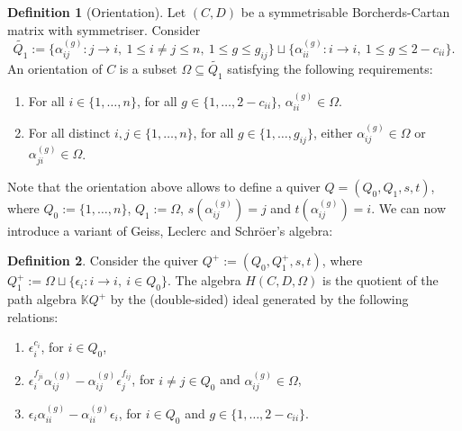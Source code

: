 \documentclass[11pt,english]{article}
\numberwithin{equation}{section}
\numberwithin{figure}{section}
\theoremstyle{definition}
\newtheorem{df}{Definition}[subsection]
\theoremstyle{plain}
\theoremstyle{remark}
\newcommand\KK{\mathbb{K}}
\begin{document}
\begin{df}[Orientation]

Let $(C,D)$ be a symmetrisable Borcherds-Cartan matrix with symmetriser.
Consider \[
\tilde{Q_1}:=\{\alpha_{ij}^{(g)}:j\rightarrow i,\ 1\leq i\ne j\leq n,\ 1\leq g\leq g_{ij}\}
\sqcup \{\alpha_{ii}^{(g)}:i\rightarrow i,\ 1\leq g\leq 2-c_{ii}\}
.
\] An orientation of $C$ is a subset $\Omega\subseteq\tilde{Q_{1}}$
satisfying the following requirements:

\begin{enumerate}

\item[(i)] For all $i\in\{1,\ldots,n\}$, for all $g\in\{1,\ldots,2-c_{ii}\}$,
$\alpha_{ii}^{(g)}\in\Omega$.

\item[(ii)] For all distinct $i,j\in\{1,\ldots,n\}$, for all $g\in\{1,\ldots,g_{ij}\}$,
either $\alpha_{ij}^{(g)}\in\Omega$ or $\alpha_{ji}^{(g)}\in\Omega$.

\end{enumerate}

\end{df}

Note that the orientation above allows to define a quiver $Q=(Q_{0},Q_{1},s,t)$,
where $Q_{0}:=\{1,\ldots,n\}$, $Q_{1}:=\Omega$, $s(\alpha_{ij}^{(g)})=j$
and $t(\alpha_{ij}^{(g)})=i$. We can now introduce a variant of Geiss,
Leclerc and Schröer's algebra:

\begin{df}

Consider the quiver $Q^{+}:=(Q_{0},Q_{1}^{+},s,t)$, where $Q_{1}^{+}:=\Omega\sqcup\{\epsilon_{i}:i\rightarrow i,\ i\in Q_{0}\}$.
The algebra $H(C,D,\Omega)$ is the quotient of the path algebra $\KK Q^{+}$
by the (double-sided) ideal generated by the following relations:

\begin{enumerate}[align=left]

\item[(H1)] $\epsilon_{i}^{c_{i}}$, for $i\in Q_{0}$,

\item[(H2)] $\epsilon_{i}^{f_{ji}}\alpha_{ij}^{(g)}-\alpha_{ij}^{(g)}\epsilon_{j}^{f_{ij}}$,
for $i\ne j\in Q_{0}$ and $\alpha_{ij}^{(g)}\in\Omega$,

\item[(H2')] $\epsilon_{i}\alpha_{ii}^{(g)}-\alpha_{ii}^{(g)}\epsilon_{i}$,
for $i\in Q_{0}$ and $g\in\{1,\ldots,2-c_{ii}\}$.

\end{enumerate}

\end{df}
\end{document}
